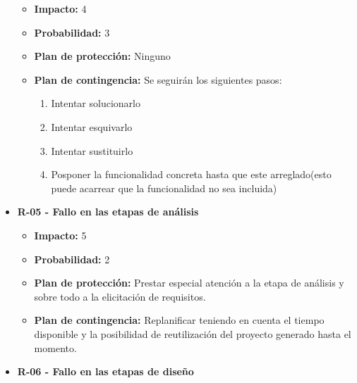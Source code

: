 \documentclass[openright,twoside,10pt]{book}
\providecommand{\tightlist}{%
  \setlength{\itemsep}{0pt}\setlength{\parskip}{0pt}}
\begin{document}
\begin{itemize}
      \begin{itemize}
      \tightlist
      \item
        \textbf{Impacto:} 4
      \item
        \textbf{Probabilidad:} 3
      \item
        \textbf{Plan de protección:} Ninguno
      \item
        \textbf{Plan de contingencia:} Se seguirán los siguientes pasos:
    
        \begin{enumerate}
        \def\labelenumi{\arabic{enumi}.}
        \tightlist
        \item
          Intentar solucionarlo
        \item
          Intentar esquivarlo
        \item
          Intentar sustituirlo
        \item
          Posponer la funcionalidad concreta hasta que este arreglado(esto
          puede acarrear que la funcionalidad no sea incluida)
        \end{enumerate}
      \end{itemize}
    \item
      \textbf{R-05 - Fallo en las etapas de análisis}
    
      \begin{itemize}
      \tightlist
      \item
        \textbf{Impacto:} 5
      \item
        \textbf{Probabilidad:} 2
      \item
        \textbf{Plan de protección:} Prestar especial atención a la etapa de
        análisis y sobre todo a la elicitación de requisitos.
      \item
        \textbf{Plan de contingencia:} Replanificar teniendo en cuenta el
        tiempo disponible y la posibilidad de reutilización del proyecto
        generado hasta el momento.
      \end{itemize}
    \item
      \textbf{R-06 - Fallo en las etapas de diseño}
    

\end{itemize}
\end{document}
